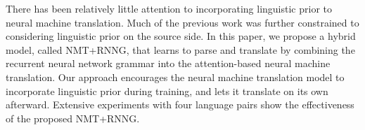 There has been relatively little attention to incorporating linguistic prior to neural machine translation. Much of the previous work was further constrained to considering linguistic prior on the source side. In this paper, we propose a hybrid model, called NMT+RNNG, that learns to parse and translate by combining the recurrent neural network grammar into the attention-based neural machine translation. Our approach encourages the neural machine translation model to incorporate linguistic prior during training, and lets it translate on its own afterward. Extensive experiments with four language pairs show the effectiveness of the proposed NMT+RNNG.
